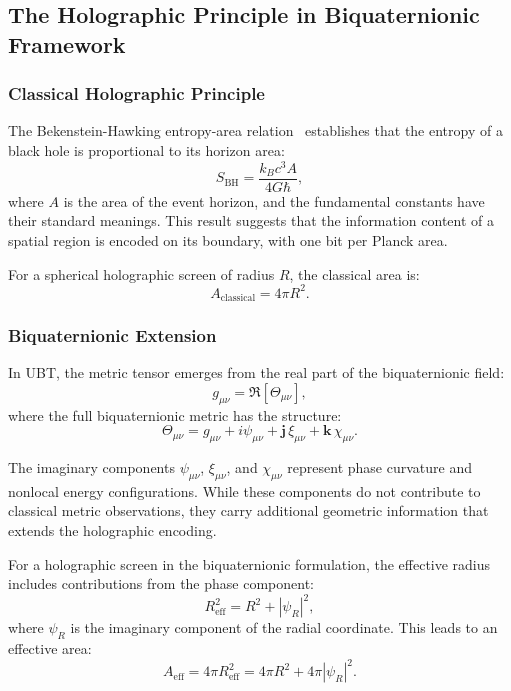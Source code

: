 \subsection{The Holographic Principle in Biquaternionic Framework}

\subsubsection{Classical Holographic Principle}

The Bekenstein-Hawking entropy-area relation~\cite{Bekenstein1973,Hawking1975} establishes that the entropy of a black hole is proportional to its horizon area:
\begin{equation}
S_{\text{BH}} = \frac{k_B c^3 A}{4 G \hbar},
\label{eq:bekenstein_hawking}
\end{equation}
where $A$ is the area of the event horizon, and the fundamental constants have their standard meanings. This result suggests that the information content of a spatial region is encoded on its boundary, with one bit per Planck area.

For a spherical holographic screen of radius $R$, the classical area is:
\begin{equation}
A_{\text{classical}} = 4\pi R^2.
\end{equation}

\subsubsection{Biquaternionic Extension}

In UBT, the metric tensor emerges from the real part of the biquaternionic field:
\begin{equation}
g_{\mu\nu} = \Re[\Theta_{\mu\nu}],
\end{equation}
where the full biquaternionic metric has the structure:
\begin{equation}
\Theta_{\mu\nu} = g_{\mu\nu} + i\psi_{\mu\nu} + \mathbf{j}\,\xi_{\mu\nu} + \mathbf{k}\,\chi_{\mu\nu}.
\end{equation}

The imaginary components $\psi_{\mu\nu}$, $\xi_{\mu\nu}$, and $\chi_{\mu\nu}$ represent phase curvature and nonlocal energy configurations. While these components do not contribute to classical metric observations, they carry additional geometric information that extends the holographic encoding.

For a holographic screen in the biquaternionic formulation, the effective radius includes contributions from the phase component:
\begin{equation}
R_{\text{eff}}^2 = R^2 + |\psi_R|^2,
\end{equation}
where $\psi_R$ is the imaginary component of the radial coordinate. This leads to an effective area:
\begin{equation}
A_{\text{eff}} = 4\pi R_{\text{eff}}^2 = 4\pi R^2 + 4\pi |\psi_R|^2.
\label{eq:effective_area}
\end{equation}

